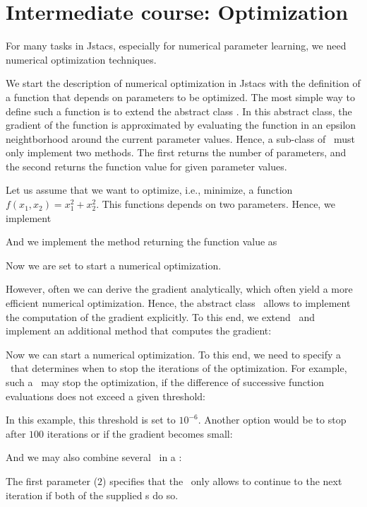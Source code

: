 \section{Intermediate course: Optimization}\label{Optimization}

\setcounter{off}{496}

For many tasks in Jstacs, especially for numerical parameter learning, we need numerical optimization techniques.

We start the description of numerical optimization in Jstacs with the definition of a function that depends on parameters to be optimized. The most simple way to define such a function is to extend the abstract class \NumericalDifferentiableFunction. In this abstract class, the gradient of the function is approximated by evaluating the function in an epsilon neightborhood around the current parameter values. Hence, a sub-class of \NumericalDifferentiableFunction~must only implement two methods. The first returns the number of parameters, and the second returns the function value for given parameter values.

Let us assume that we want to optimize, i.e., minimize, a function $f(x_1,x_2)=x_1^2 + x_2^2$. This functions depends on two parameters. Hence, we implement
\addtocounter{off}{6}
And we implement the method returning the function value as
\addtocounter{off}{5}
Now we are set to start a numerical optimization.

However, often we can derive the gradient analytically, which often yield a more efficient numerical optimization. Hence, the abstract class \DifferentiableFunction~allows to implement the computation of the gradient explicitly. To this end, we extend \DifferentiableFunction~and implement an additional method that computes the gradient:
\addtocounter{off}{19}

Now we can start a numerical optimization. To this end, we need to specify a \TerminationCondition~that determines when to stop the iterations of the optimization. For example, such a \TerminationCondition~may stop the optimization, if the difference of successive function evaluations does not exceed a given threshold:
\addtocounter{off}{7}
In this example, this threshold is set to $10^{-6}$. Another option would be to stop after $100$ iterations or if the gradient becomes small:
\addtocounter{off}{1}

And we may also combine several \TerminationCondition~in a \CombinedCondition:
\addtocounter{off}{3}
The first parameter ($2$) specifies that the \CombinedCondition~only allows to continue to the next iteration if both of the supplied \TerminationCondition s do so. 

